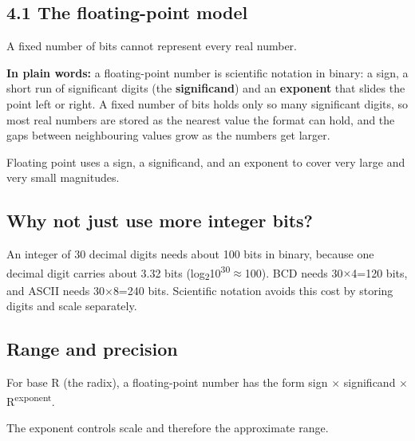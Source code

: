 \documentclass[11pt]{article}
\begin{document}
\begin{keepsection}
\section{4.1 The floating-point model}

A fixed number of bits cannot represent every real number.

\begin{plainbox}\textbf{In plain words:} a floating-point number is scientific notation in binary: a sign, a short run of significant digits (the \textbf{significand}) and an \textbf{exponent} that slides the point left or right. A fixed number of bits holds only so many significant digits, so most real numbers are stored as the nearest value the format can hold, and the gaps between neighbouring values grow as the numbers get larger.\end{plainbox}

Floating point uses a sign, a significand, and an exponent to cover very large and very small magnitudes.

\begin{keepsection}
\subsection{Why not just use more integer bits?}

An integer of 30 decimal digits needs about 100 bits in binary, because one decimal digit carries about 3.32 bits (log\textsubscript{2}10\textsuperscript{30}\ensuremath{\approx}100). BCD needs 30\ensuremath{\times}4=120 bits, and ASCII needs 30\ensuremath{\times}8=240 bits. Scientific notation avoids this cost by storing digits and scale separately.
\end{keepsection}

\begin{keepsection}
\subsection{Range and precision}

For base R (the radix), a floating-point number has the form sign \ensuremath{\times} significand \ensuremath{\times} R\textsuperscript{exponent}.

The exponent controls scale and therefore the approximate range.


\end{keepsection}
\end{keepsection}
\end{document}
